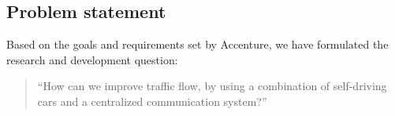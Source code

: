 \subsection{Problem statement}
Based on the goals and requirements set by Accenture, we have formulated the research and development question:
\begin{quote}
	``How can we improve traffic flow, by using a combination of self-driving cars and a centralized communication system?''
\end{quote}